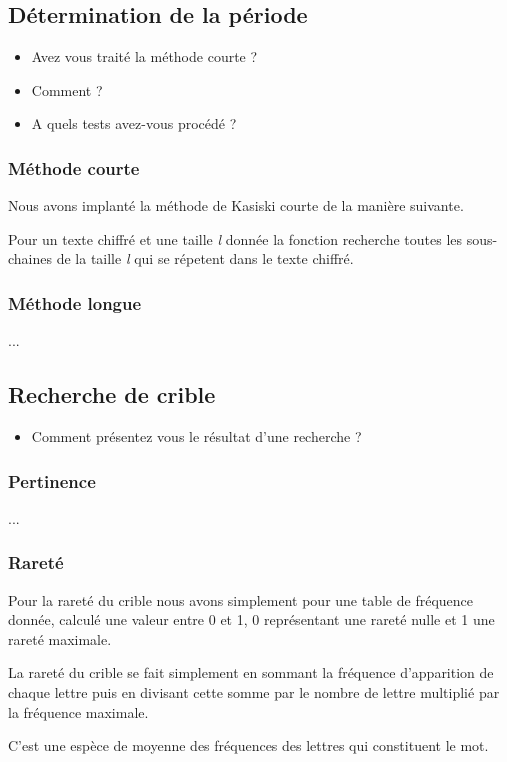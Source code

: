 \documentclass[a4paper, 11pt]{article}
\begin{document}
\subsection{Détermination de la période}

\begin{itemize}
\item Avez vous traité la méthode courte ?
\item Comment ?
\item A quels tests avez-vous procédé ?
\end{itemize}


\subsubsection{Méthode courte}
Nous avons implanté la méthode de Kasiski courte de la manière
suivante.

Pour un texte chiffré et une taille \textit{l} donnée la fonction recherche toutes
les sous-chaines de la taille \textit{l} qui se répetent dans le texte
chiffré.

\subsubsection{Méthode longue}
... 

\subsection{Recherche de crible}
\begin{itemize}
\item Comment présentez vous le résultat d'une recherche ?
\end{itemize}
\subsubsection{Pertinence}
...
\subsubsection{Rareté}
Pour la rareté du crible nous avons simplement pour une table de
fréquence donnée, calculé une valeur entre 0 et 1, 0 représentant une
rareté nulle et 1 une rareté maximale.

La rareté du crible se fait simplement en sommant la fréquence
d'apparition de chaque lettre puis en divisant cette somme par le
nombre de lettre multiplié par la fréquence maximale.

C'est une espèce de moyenne des fréquences des lettres qui constituent
le mot.
\end{document}
